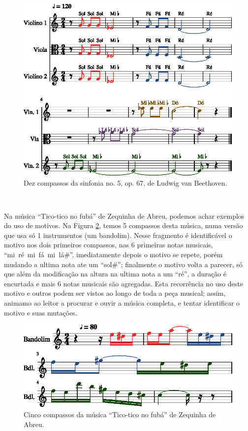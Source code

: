 \begin{figure}[!h]
  \centering
    \includegraphics[width=\workboxsize]{chapters/cap-musica-composer/Symphony5Op67-out-1.eps}
\caption{Dez compassos da sinfonia no. 5, op. 67, de Ludwig van Beethoven.}
\label{fig:10Symphony5Op67}
\end{figure}

~


\begin{example}
Na música ``Tico-tico no fubá'' de Zequinha de Abreu, podemos achar exemplos do uso de motivos. 
Na Figura \ref{fig:Tico-tico_no_fuba-1}, temos 5 compassos desta música,
numa versão que usa só 1 instrumentos (um bandolim).
Nesse fragmento é identificável o motivo nos dois primeiros compassos, 
nas 6 primeiras notas musicais, ``mi~ré~mi~fá~mi~lá$\#$''.
imediatamente depois o motivo se repete, porém mudando a ultima nota ate um ``sol$\#$'';
finalmente o motivo volta a parecer, só que além da modificação na altura na ultima nota a um ``ré'',
a duração é encurtada e mais 6 notas musicais são agregadas.
Esta recorrência no uso deste motivo e outros podem ser vistos ao longo de toda a peça musical;
assim, animamo ao leitor a procurar e ouvir a música completa, e tentar identificar o motivo e suas mutações. 
\end{example}

\begin{figure}[!h]
  \centering
    \includegraphics[width=\workboxsize]{chapters/cap-musica-composer/Tico-tico_no_fuba-1.eps}
\caption{Cinco compassos da música ``Tico-tico no fubá'' de Zequinha de Abreu.}
\label{fig:Tico-tico_no_fuba-1}
\end{figure}

~

